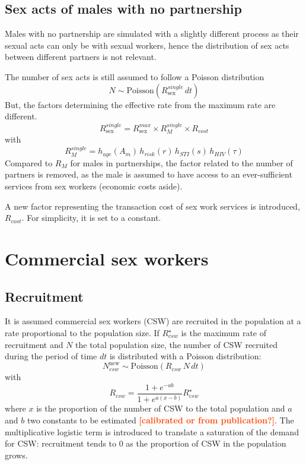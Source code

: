 \documentclass[11pt, onecolumn]{article}
\newcommand{\warning}[1]{\textbf{\textcolor{OrangeRed}{#1}}}
\begin{document}
\subsection{Sex acts of males with no partnership}

Males with no partnership are simulated with a slightly different process as their sexual acts can only be with sexual workers, hence the distribution of sex acts between different partners is not relevant.

The number of sex acts is still assumed to follow a Poisson distribution
$$N\sim \mathrm{Poisson}(R_{\mathrm{sex}}^{single}\, dt)$$
But, the factors determining the effective rate from the maximum rate are different.
$$R_{\mathrm{sex}}^{single} = R_{\mathrm{sex}}^{max} \times R_{M}^{single} \times R_{cost} $$
with 
$$R_M^{single}= h_{age}(A_m)  \, h_{risk}(r) \,h_{STI}(s) \,h_{HIV}(\tau)  $$
Compared to $R_M$ for males in partnerships, the factor related to the number of partners is removed, as the male is assumed to have access to an ever-sufficient services from sex workers (economic costs aside).

A new factor representing the transaction cost of sex work services is introduced, $R_{cost}$. For simplicity, it is set to a constant. 




\section{Commercial sex workers}

\subsection{Recruitment}

It is assumed commercial sex workers (CSW) are recruited in the population at a rate proportional to the population size. If $R_{csw}^{\star}$ is the maximum rate of recruitment and $N$ the total population size, the number of CSW recruited during the period of time $dt$ is distributed with a Poisson distribution:
$$N_{csw}^{\mathrm{new}} \sim \text{Poisson}\left(R_{csw}\,N\,dt\right)$$
with 
$$ R_{csw} = \frac{1+e^{-ab}}{1+e^{a(x-b)}}R_{csw}^{\star}$$
where $x$ is the proportion of the number of CSW to the total population and $a$ and $b$ two constants to be estimated \warning{[calibrated or from publication?]}. The multiplicative logistic term is introduced to translate a saturation of the demand for CSW: recruitment tends to 0 as the proportion of CSW in the population grows.
\end{document}
